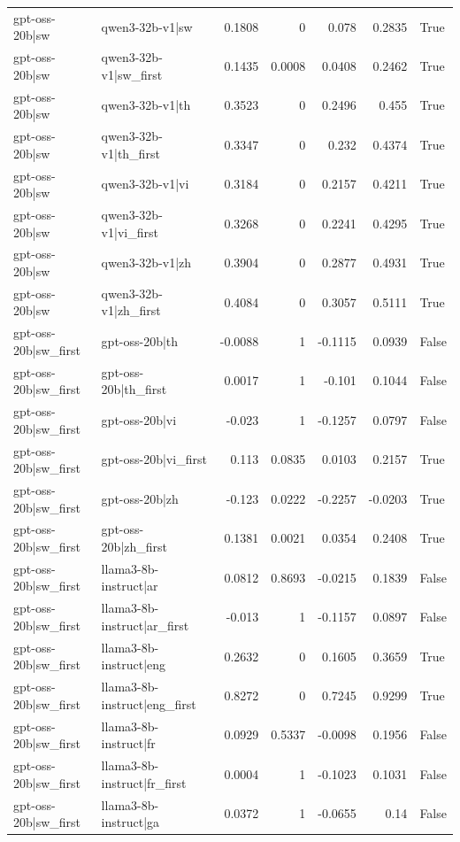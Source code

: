 \begin{table}
\begin{tabular}{l l r r r r l}
gpt-oss-20b|sw & qwen3-32b-v1|sw & 0.1808 & 0 & 0.078 & 0.2835 & True \\
gpt-oss-20b|sw & qwen3-32b-v1|sw_first & 0.1435 & 0.0008 & 0.0408 & 0.2462 & True \\
gpt-oss-20b|sw & qwen3-32b-v1|th & 0.3523 & 0 & 0.2496 & 0.455 & True \\
gpt-oss-20b|sw & qwen3-32b-v1|th_first & 0.3347 & 0 & 0.232 & 0.4374 & True \\
gpt-oss-20b|sw & qwen3-32b-v1|vi & 0.3184 & 0 & 0.2157 & 0.4211 & True \\
gpt-oss-20b|sw & qwen3-32b-v1|vi_first & 0.3268 & 0 & 0.2241 & 0.4295 & True \\
gpt-oss-20b|sw & qwen3-32b-v1|zh & 0.3904 & 0 & 0.2877 & 0.4931 & True \\
gpt-oss-20b|sw & qwen3-32b-v1|zh_first & 0.4084 & 0 & 0.3057 & 0.5111 & True \\
gpt-oss-20b|sw_first & gpt-oss-20b|th & -0.0088 & 1 & -0.1115 & 0.0939 & False \\
gpt-oss-20b|sw_first & gpt-oss-20b|th_first & 0.0017 & 1 & -0.101 & 0.1044 & False \\
gpt-oss-20b|sw_first & gpt-oss-20b|vi & -0.023 & 1 & -0.1257 & 0.0797 & False \\
gpt-oss-20b|sw_first & gpt-oss-20b|vi_first & 0.113 & 0.0835 & 0.0103 & 0.2157 & True \\
gpt-oss-20b|sw_first & gpt-oss-20b|zh & -0.123 & 0.0222 & -0.2257 & -0.0203 & True \\
gpt-oss-20b|sw_first & gpt-oss-20b|zh_first & 0.1381 & 0.0021 & 0.0354 & 0.2408 & True \\
gpt-oss-20b|sw_first & llama3-8b-instruct|ar & 0.0812 & 0.8693 & -0.0215 & 0.1839 & False \\
gpt-oss-20b|sw_first & llama3-8b-instruct|ar_first & -0.013 & 1 & -0.1157 & 0.0897 & False \\
gpt-oss-20b|sw_first & llama3-8b-instruct|eng & 0.2632 & 0 & 0.1605 & 0.3659 & True \\
gpt-oss-20b|sw_first & llama3-8b-instruct|eng_first & 0.8272 & 0 & 0.7245 & 0.9299 & True \\
gpt-oss-20b|sw_first & llama3-8b-instruct|fr & 0.0929 & 0.5337 & -0.0098 & 0.1956 & False \\
gpt-oss-20b|sw_first & llama3-8b-instruct|fr_first & 0.0004 & 1 & -0.1023 & 0.1031 & False \\
gpt-oss-20b|sw_first & llama3-8b-instruct|ga & 0.0372 & 1 & -0.0655 & 0.14 & False \\

\end{tabular}
\end{table}
